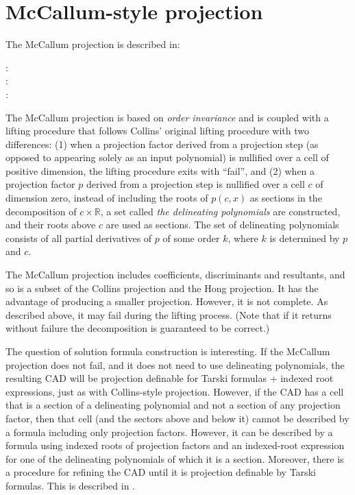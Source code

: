 \documentclass{article}
\newcommand{\realring}{\mathbb{R}}
\begin{document}
\section{McCallum-style projection}
The McCallum projection is described in:
%
\begin{description}
\item[\autocite{McCallum:84} :]  
\item[\autocite{McCallum:88} :]  
\item[\autocite{McCallum:97} :]  
\end{description}
%
The McCallum projection is based on \emph{order invariance} and is
coupled with a lifting procedure that follows Collins' original
lifting procedure with two differences:
(1) when a projection factor derived from a projection step (as
opposed to appearing solely as an input polynomial) is nullified over a cell
of positive dimension, the lifting procedure exits with ``fail'', and
(2) when a projection factor $p$ derived from a projection step is
nullified over 
a cell $c$ of dimension zero, instead of including the roots of $p(c,x)$ as
sections in the decomposition of $c\times\realring$, a set called
\emph{the delineating polynomials} are constructed, and their roots
above $c$ are used as sections.  The set of delineating polynomials
consists of all partial derivatives of $p$ of some order $k$, where $k$ is
determined by $p$ and $c$.

The McCallum projection includes coefficients, discriminants and
resultants, and so is a subset of the Collins projection and the Hong
projection.  It has the advantage of producing a smaller
projection.  However, it is not complete.  As described above, it may
fail during the lifting process.  (Note that if it returns without
failure the decomposition is guaranteed to be correct.)

The question of solution formula construction is interesting.  If the
McCallum projection does not fail, and it does not need to use
delineating polynomials, the resulting CAD will be projection
definable for Tarski formulas + indexed root expressions, just as with
Collins-style projection.  However, if the CAD has a cell that is a
section of a delineating polynomial and not a section of any
projection factor, then that cell (and the sectors above and below it)
cannot be described by a formula including only projection factors.
However, it can be described by a formula using indexed roots of
projection factors and an indexed-root expression for one of the
delineating polynomials of which it is a section.  Moreover, there is
a procedure for refining the CAD until it is projection definable
by Tarski formulas.  This is described in \autocite{Brown:99a}.
\end{document}
